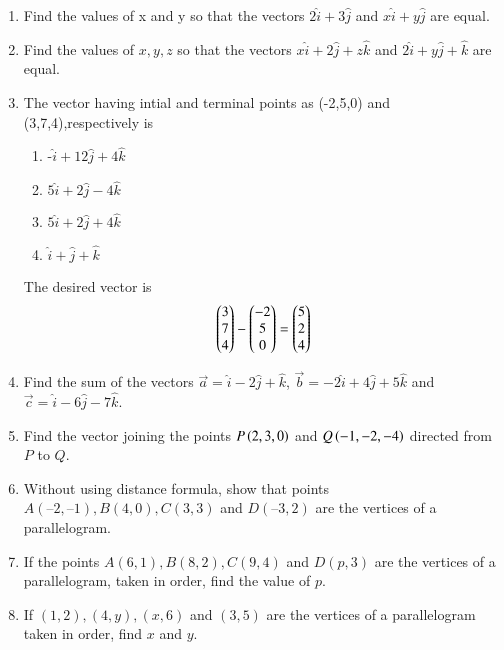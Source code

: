 \begin{enumerate}[label=\thesubsection.\arabic*,ref=\thesubsection.\theenumi]
	\item 		Find the values of x and y so that the vectors
$2\hat{i}+3\hat{j}$
and 
$x\hat{i}+y\hat{j}$
are equal.
\\
\solution

\item Find the values of $x,y,z$ so that the vectors 
$x\hat{i}+2\hat{j}+z\hat{k}$
and 
$2\hat{i}+y\hat{j}+\hat{k}$
are equal.
\item The vector having intial and terminal points as (-2,5,0) and (3,7,4),respectively is
	\begin{enumerate}
\item -$\hat{i}+12\hat{j}+4\hat{k}$
\item $5\hat{i}+2\hat{j}-4\hat{k}$
\item $5\hat{i}+2\hat{j}+4\hat{k}$
\item $\hat{i}+\hat{j}+\hat{k}$
\end{enumerate}
\solution
The desired vector is
\begin{align}
	\begin{pmatrix}3 \\ 7 \\ 4\end{pmatrix}
	-\begin{pmatrix}-2 \\ 5 \\ 0\end{pmatrix} = 
	\begin{pmatrix}5 \\ 2 \\ 4\end{pmatrix}  
\end{align}
\item Find the sum of the vectors $\vec{a}=\hat{i}-2\hat{j}+\hat{k}$, $\vec{b}=-2\hat{i}+4\hat{j}+5\hat{k}$ and $\vec{c}=\hat{i}-6\hat{j}-7\hat{k}$.
\item Find the vector joining the points $P\left(2,3,0\right)$ and $Q\left(-1,-2,-4\right)$ directed from $P$ to $Q$.
\item Without using distance formula, show that points $A(– 2, – 1), B(4, 0), C(3, 3)$ and $D(–3, 2)$ are the vertices of a parallelogram.
\label{chapters/11/10/1/9}
\\
\solution

\item If the points $A(6, 1), B(8, 2), C(9, 4)$ and $D(p, 3)$ are the vertices of a parallelogram, taken in order, find the value of $p$.
\label{10/7/0/10}
\item 
If $(1, 2), (4, y), (x, 6)$ and $(3, 5)$ are the vertices of a parallelogram taken in order, find $x$ and $y$.
\label{10/7/2/6}
	\\
		\solution
	

\end{enumerate}
